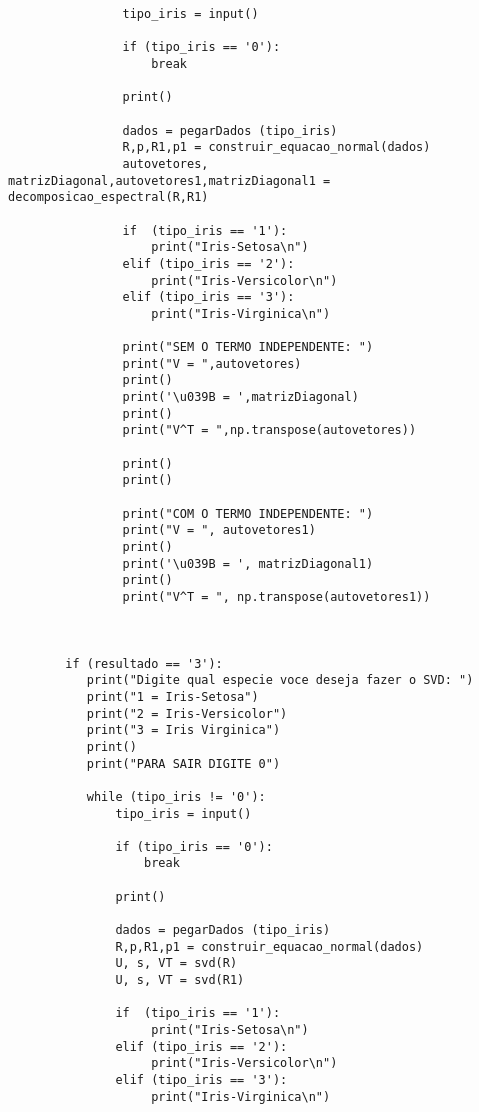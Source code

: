 \documentclass[a4paper,12pt,twoside]{article}
\begin{document}
\begin{lstlisting}
                tipo_iris = input()
                
                if (tipo_iris == '0'):
                    break
                    
                print()
           
                dados = pegarDados (tipo_iris)
                R,p,R1,p1 = construir_equacao_normal(dados)
                autovetores, matrizDiagonal,autovetores1,matrizDiagonal1 = decomposicao_espectral(R,R1)
                
                if  (tipo_iris == '1'):
                    print("Iris-Setosa\n")
                elif (tipo_iris == '2'):
                    print("Iris-Versicolor\n")
                elif (tipo_iris == '3'):
                    print("Iris-Virginica\n")
                
                print("SEM O TERMO INDEPENDENTE: ")
                print("V = ",autovetores)
                print()
                print('\u039B = ',matrizDiagonal)
                print()
                print("V^T = ",np.transpose(autovetores))
                
                print()
                print()
                
                print("COM O TERMO INDEPENDENTE: ")
                print("V = ", autovetores1)
                print()
                print('\u039B = ', matrizDiagonal1)
                print()
                print("V^T = ", np.transpose(autovetores1))
                
        
        
        if (resultado == '3'):
           print("Digite qual especie voce deseja fazer o SVD: ")
           print("1 = Iris-Setosa")
           print("2 = Iris-Versicolor")
           print("3 = Iris Virginica")
           print()
           print("PARA SAIR DIGITE 0")
            
           while (tipo_iris != '0'):        
               tipo_iris = input()
                
               if (tipo_iris == '0'):
                   break
                    
               print()
                
               dados = pegarDados (tipo_iris)
               R,p,R1,p1 = construir_equacao_normal(dados)
               U, s, VT = svd(R)
               U, s, VT = svd(R1)
               
               if  (tipo_iris == '1'):
                    print("Iris-Setosa\n")
               elif (tipo_iris == '2'):
                    print("Iris-Versicolor\n")
               elif (tipo_iris == '3'):
                    print("Iris-Virginica\n")
               

\end{lstlisting}
\end{document}
